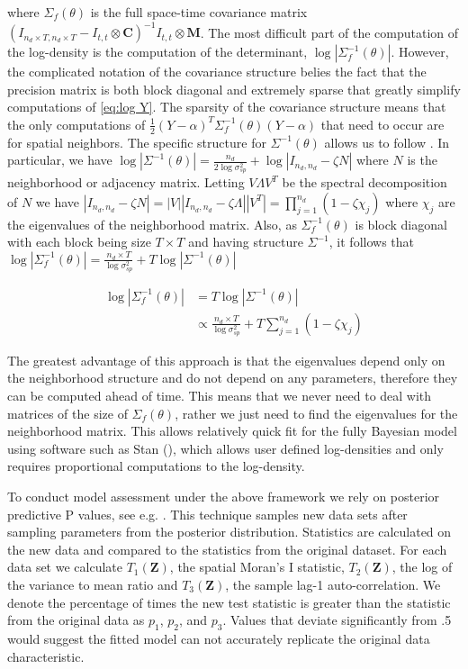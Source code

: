 \documentclass[11pt]{isuthesis}
\begin{document}
where $\Sigma_f(\theta)$ is the full space-time covariance matrix $\left(I_{n_d \times T,n_d \times T}-I_{t,t}\otimes \boldsymbol{C}\right)^{-1}I_{t,t}\otimes \boldsymbol{M}$.  The most difficult part of the computation of the log-density is the computation of the determinant, $\log | \Sigma_f^{-1}(\theta)|$.  However, the complicated notation of the covariance structure belies the fact that the precision matrix is both block diagonal and extremely sparse that greatly simplify computations of \eqref{eq:log Y}.  The sparsity of the covariance structure means that the only computations of $\frac{1}{2}(Y-\alpha)^T\Sigma_f^{-1}(\theta)(Y-\alpha)$ that need to occur are for spatial neighbors.  The specific structure for $\Sigma^{-1}(\theta)$ allows us to follow \cite{jin2005generalized}.  In particular, we have $\log|\Sigma^{-1}(\theta)|=\frac{n_d}{2\log\sigma_{sp}^2}+\log|I_{n_d,n_d}-\zeta N|$ where $N$ is the neighborhood or adjacency matrix.  Letting $V \Lambda V^T$ be the spectral decomposition of $N$ we have $|I_{n_d,n_d}-\zeta N|=|V| |I_{n_d,n_d}-\zeta \Lambda| |V^T|=\prod_{j=1}^{n_d}\left(1-\zeta \chi_j\right)$ where $\chi_j$ are the eigenvalues of the neighborhood matrix.  Also, as $ \Sigma_f^{-1}(\theta)$ is block diagonal with each block being size $T \times T$ and having structure $\Sigma^{-1}$, it follows that $\log| \Sigma_f^{-1}(\theta)|=\frac{n_d \times T}{\log\sigma_{sp}^2}+T\log| \Sigma^{-1}(\theta)|$

\begin{align}
	\log | \Sigma_f^{-1}(\theta)|&  = T \log | \Sigma^{-1}(\theta)|\\
	& \propto \frac{n_d \times T}{\log\sigma_{sp}^2}+ T \sum_{j=1}^{n_d}(1-\zeta\chi_j) \label{eq:eig}
\end{align}

The greatest advantage of this approach is that the eigenvalues depend only on the neighborhood structure and do not depend on any parameters, therefore they can be computed ahead of time.  This means that we never need to deal with matrices of the size of  $\Sigma_f(\theta)$, rather we just need to find the eigenvalues for the neighborhood matrix.  This allows relatively quick fit for the fully Bayesian model using software such as Stan (\cite{carpenter2016stan}), which allows user defined log-densities and only requires proportional computations to the log-density. 

To conduct model assessment under the above framework we rely on posterior predictive P values, see e.g. \cite{gelman1996posterior}.  This technique samples new data sets after sampling parameters from the posterior distribution.  Statistics are calculated on the new data and compared to the statistics from the original dataset.  For each data set we calculate $T_1(\boldsymbol{Z})$, the spatial Moran's I statistic, $T_2(\boldsymbol{Z})$, the log of the variance to mean ratio and $T_3(\boldsymbol{Z})$, the sample lag-1 auto-correlation.  We denote the percentage of times the new test statistic is greater than the statistic from the original data as $p_1$, $p_2$, and $p_3$.  Values that deviate significantly from .5 would suggest the fitted model can not accurately replicate the original data characteristic.
\end{document}
